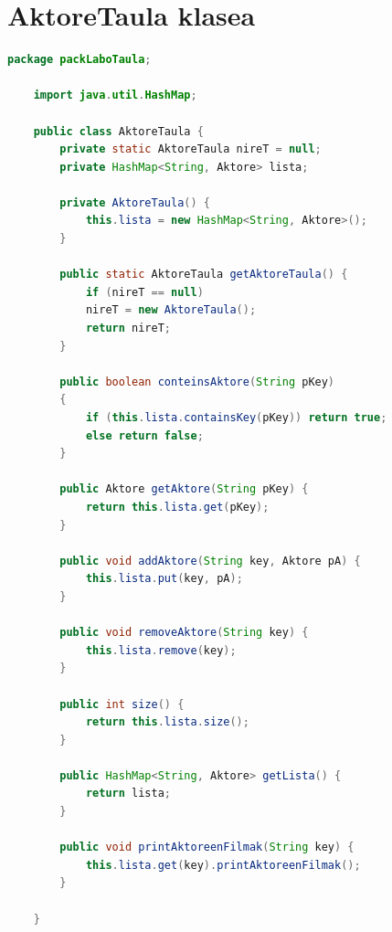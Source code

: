 \documentclass[a4paper,10pt]{report}
\begin{document}
\section{AktoreTaula klasea}
\begin{lstlisting}[language=java]
	package packLaboTaula;
	
	import java.util.HashMap;
	
	public class AktoreTaula {
		private static AktoreTaula nireT = null;
		private HashMap<String, Aktore> lista;
		
		private AktoreTaula() {
			this.lista = new HashMap<String, Aktore>(); 
		}
		
		public static AktoreTaula getAktoreTaula() {
			if (nireT == null)
			nireT = new AktoreTaula();
			return nireT;
		}
		
		public boolean conteinsAktore(String pKey)
		{
			if (this.lista.containsKey(pKey)) return true;
			else return false;
		}
		
		public Aktore getAktore(String pKey) {
			return this.lista.get(pKey);
		}
		
		public void addAktore(String key, Aktore pA) {
			this.lista.put(key, pA);
		}
		
		public void removeAktore(String key) {
			this.lista.remove(key);
		}
		
		public int size() {
			return this.lista.size();
		}
		
		public HashMap<String, Aktore> getLista() {
			return lista;
		}
		
		public void printAktoreenFilmak(String key) {
			this.lista.get(key).printAktoreenFilmak();
		}
		
	}
\end{lstlisting}
\end{document}
